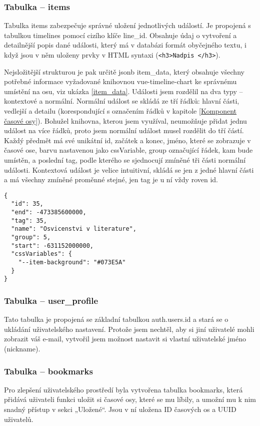\subsubsection{Tabulka – items}
Tabulka items zabezpečuje správné uložení jednotlivých událostí. Je propojená s tabulkou timelines pomocí cizího klíče line\_id. Obsahuje údaj o vytvoření a detailnější popis dané události, který má v databázi formát obyčejného textu, i když jsou v něm uloženy prvky v HTML syntaxi (\texttt{\textless h3\textgreater Nadpis \textless /h3\textgreater}).

Nejsložitější strukturou je pak určitě jsonb item\_data, který obsahuje všechny potřebné informace vyžadované knihovnou vue-timeline-chart ke správnému umístění na osu, viz ukázka \ref{item_data}.
Události jsem rozdělil na dva typy – kontextové a normální. Normální událost se skládá ze tří řádků: hlavní části, vedlejší a detailu (korespondující s označením řádků v kapitole \ref{Komponent časové osy}). Bohužel knihovna, kterou jsem využíval, neumožňuje přidat jednu událost na více řádků, proto jsem normální událost musel rozdělit do tří částí. Každý předmět má své unikátní id, začátek a konec, jméno, které se zobrazuje v časové ose, barvu nastavenou jako cssVariable, group označující řádek, kam bude umístěn, a poslední tag, podle kterého se sjednocují zmíněné tři části normální události. Kontextová událost je velice intuitivní, skládá se jen z jedné hlavní části a má všechny zmíněné proměnné stejné, jen tag je u ní vždy roven id.

\begin{lstlisting}[style=JavaScript, firstnumber = 1, caption={item\_data, Supabase items table}, label={item_data}]
{
  "id": 35,
  "end": -473385600000,
  "tag": 35,
  "name": "Osvicenstvi v literature",
  "group": 5,
  "start": -631152000000,
  "cssVariables": {
    "--item-background": "#073E5A"
  }
}
\end{lstlisting}

\subsubsection{Tabulka – user\_profile}
Tato tabulka je propojená se základní tabulkou auth.users.id a stará se o ukládání uživatelského nastavení. Protože jsem nechtěl, aby si jiní uživatelé mohli zobrazit váš e-mail, vytvořil jsem možnost nastavit si vlastní uživatelské jméno (nickname).  

\subsubsection{Tabulka – bookmarks}
Pro zlepšení uživatelského prostředí byla vytvořena tabulka bookmarks, která přidává uživateli funkci uložit si časové osy, které se mu líbily, a umožní mu k nim snadný přístup v sekci „Uložené“. Jsou v ní uložena ID časových os a UUID uživatelů.


